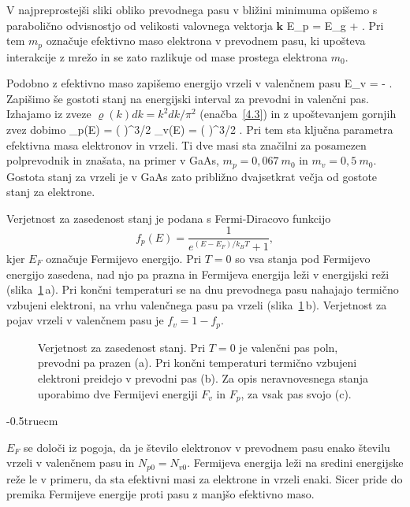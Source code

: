 V najpreprostejši sliki obliko prevodnega pasu v bližini minimuma opišemo 
s parabolično odvisnostjo od velikosti valovnega vektorja $\mathbf{k}$
\beq
E_p = E_g + .
\label{pp:Ec}
\eeq
Pri tem $m_p$ označuje efektivno maso elektrona v prevodnem pasu, ki upošteva
interakcije z mrežo in se zato razlikuje od mase prostega elektrona $m_0$.

Podobno z efektivno maso zapišemo energijo vrzeli v valenčnem pasu
\beq
E_v = - .
\label{pp:Ev}
\eeq
Zapišimo še gostoti stanj na energijski interval za prevodni in valenčni pas. Izhajamo iz zveze
$\varrho(k) dk = k^2dk /\pi^2$ (enačba~\ref{4.3}) in z upoštevanjem gornjih zvez dobimo
\beq
\varrho_p(E) = \left( \right)^{3/2} 
\qquad {}\qquad
\varrho_v(E) = \left( \right)^{3/2} .
\label{eq:rho_p}
\eeq
Pri tem sta ključna parametra efektivna masa 
elektronov in vrzeli. Ti dve masi sta značilni za posamezen polprevodnik
in znašata, na primer v GaAs, $m_p = 0,067~m_0$ in $m_v = 0,5~m_0$. 
Gostota stanj za vrzeli je v GaAs zato približno 
dvajsetkrat večja od gostote stanj za elektrone.

Verjetnost za zasedenost stanj je podana s Fermi-Diracovo funkcijo 
\begin{equation}  
f_p(E)=\frac{1}{e^{(E-E_F)/k_B T}+1},
\label{eq:7FD}
\end{equation}
kjer $E_F$ označuje Fermijevo energijo. Pri $T=0$ so vsa stanja pod 
Fermijevo energijo zasedena, nad njo pa prazna in Fermijeva energija leži
v energijski reži (slika~\ref{fig:Fermi}\,a). Pri končni temperaturi se na dnu prevodnega pasu nahajajo 
termično vzbujeni elektroni, na vrhu valenčnega pasu pa vrzeli (slika~\ref{fig:Fermi}\,b). Verjetnost 
za pojav vrzeli v valenčnem pasu je $f_v = 1 - f_p$.
\begin{figure}[h]
\centering
\def\svgwidth{145truemm} 

\caption{Verjetnost za zasedenost stanj. Pri $T=0$ je valenčni pas poln, prevodni pa prazen (a).
Pri končni temperaturi termično vzbujeni elektroni preidejo v prevodni pas (b). Za opis neravnovesnega
stanja uporabimo dve Fermijevi energiji $F_v$ in $F_p$, za vsak pas svojo (c).
}
\label{fig:Fermi}
\end{figure}
\vglue-0.5truecm
\begin{remark}
$E_F$ se določi iz pogoja, da je število elektronov v prevodnem pasu enako 
številu vrzeli v valenčnem pasu in $N_{p0} = N_{v0}$. Fermijeva energija
leži na sredini energijske reže le v primeru, da sta efektivni masi 
za elektrone in vrzeli enaki. Sicer pride do premika Fermijeve energije 
proti pasu z manjšo efektivno maso. 
\end{remark}

